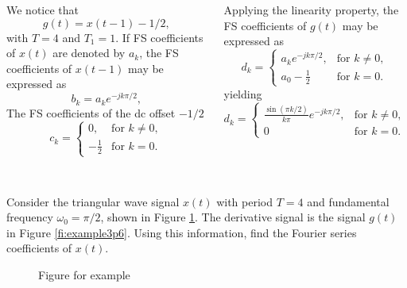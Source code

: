 \begin{frame}
{
    \begin{columns}

            We notice that
            \begin{equation*}
                g(t) = x(t-1) - 1/2,
            \end{equation*}
            with $T=4$ and $T_1 = 1$.
            \pause
            If FS coefficients of $x(t)$ are denoted by $a_k$, the FS coefficients of $x(t-1)$ may be expressed as
            \begin{equation*}
                b_k = a_k e^{-jk\pi/2},
            \end{equation*}
            The FS coefficients of the dc offset $-1/2$
            \begin{equation*}
                c_k =
                \begin{cases}
                    0, & \text{for } k \neq 0,\\
                    -\frac{1}{2}& \text{for } k = 0.
                \end{cases}
            \end{equation*}
            \

            Applying the linearity property, the FS coefficients of $g(t)$ may be expressed as
            \pause
            \begin{equation*}
                d_k =
                \begin{cases}
                    a_k e^{-jk\pi/2}, & \text{for } k \neq 0,\\
                    a_0-\frac{1}{2}& \text{for } k = 0.
                \end{cases}
            \end{equation*}
            yielding
            \begin{equation*}
                d_k =
                \begin{cases}
                    \frac{\sin(\pi k/2)}{k\pi} e^{-jk\pi/2}, & \text{for } k \neq 0,\\
                    0& \text{for } k = 0.
                \end{cases}
            \end{equation*}
   \end{columns}
}
\end{frame}


\begin{frame}%
    \begin{example}
        Consider the triangular wave signal $x(t)$ with period $T=4$ and fundamental frequency $\omega_0 = \pi/2$, shown in Figure \ref{fi:example3p7}. The derivative signal is the signal $g(t)$ in Figure \ref{fi:example3p6}. Using this information, find the Fourier series coefficients of $x(t)$.
        \begin{figure}
          \centering
          
          \caption{Figure for example}\label{fi:example3p7}
        \end{figure}
    \end{example}
\end{frame}

